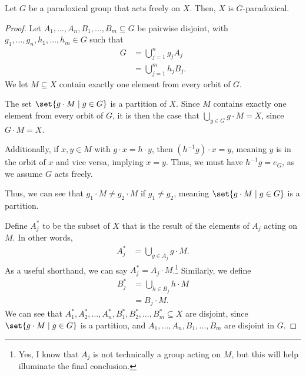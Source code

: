 \documentclass[12pt]{mypackage}
\begin{document}
\begin{proposition}
  Let $G$ be a paradoxical group that acts freely on $X$. Then, $X$ is $G$-paradoxical.
\end{proposition}
\begin{proof}
  Let $A_1,\dots,A_n,B_1,\dots,B_m\subseteq G$ be pairwise disjoint, with $g_1,\dots,g_n,h_1,\dots,h_m\in G$ such that
  \begin{align*}
    G &= \bigcup_{j=1}^{n}g_j A_j\\
      &= \bigcup_{j=1}^{m}h_jB_j.
  \end{align*}
  We let $M\subseteq X$ contain exactly one element from every orbit of $G$.\newline

  The set $\set{g\cdot M\mid g\in G}$ is a partition of $X$. Since $M$ contains exactly one element from every orbit of $G$, it is then the case that $\bigcup_{g\in G}g\cdot M = X$, since $G\cdot M = X$.\newline

  Additionally, if $x,y\in M$ with $g\cdot x = h\cdot y$, then $\left(h^{-1}g\right)\cdot x = y$, meaning $y$ is in the orbit of $x$ and vice versa, implying $x = y$. Thus, we must have $h^{-1}g = e_G$, as we assume $G$ acts freely.\newline

  Thus, we can see that $g_1\cdot M \neq g_2\cdot M$ if $g_1\neq g_2$, meaning $\set{g\cdot M\mid g\in G}$ is a partition.\newline

  Define $A_{j}^{\ast}$ to be the subset of $X$ that is the result of the elements of $A_j$ acting on $M$. In other words,
  \begin{align*}
    A_j^{\ast} &= \bigcup_{g\in A_j}g\cdot M.
  \end{align*}
  As a useful shorthand, we can say $A_j^{\ast} = A_j\cdot M$.\footnote{Yes, I know that $A_j$ is not technically a group acting on $M$, but this will help illuminate the final conclusion.} Similarly, we define
  \begin{align*}
    B_j^{\ast} &= \bigcup_{h\in B_j}h\cdot M\\
               &= B_j\cdot M.
  \end{align*}
  We can see that $A_1^{\ast},A_2^{\ast},\dots,A_n^{\ast},B_1^{\ast},B_2^{\ast},\dots,B_m^{\ast}\subseteq X$ are disjoint, since $\set{g\cdot M\mid g\in G}$ is a partition, and $A_1,\dots,A_n,B_1,\dots,B_m$ are disjoint in $G$.\newline


\end{proof}
\end{document}
